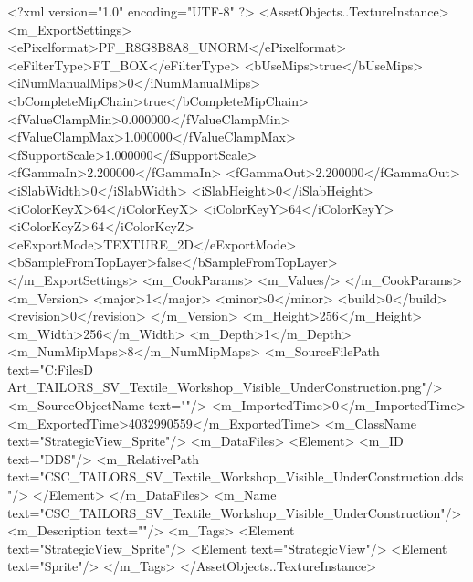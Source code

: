 <?xml version="1.0" encoding="UTF-8" ?>
<AssetObjects..TextureInstance>
	<m_ExportSettings>
		<ePixelformat>PF_R8G8B8A8_UNORM</ePixelformat>
		<eFilterType>FT_BOX</eFilterType>
		<bUseMips>true</bUseMips>
		<iNumManualMips>0</iNumManualMips>
		<bCompleteMipChain>true</bCompleteMipChain>
		<fValueClampMin>0.000000</fValueClampMin>
		<fValueClampMax>1.000000</fValueClampMax>
		<fSupportScale>1.000000</fSupportScale>
		<fGammaIn>2.200000</fGammaIn>
		<fGammaOut>2.200000</fGammaOut>
		<iSlabWidth>0</iSlabWidth>
		<iSlabHeight>0</iSlabHeight>
		<iColorKeyX>64</iColorKeyX>
		<iColorKeyY>64</iColorKeyY>
		<iColorKeyZ>64</iColorKeyZ>
		<eExportMode>TEXTURE_2D</eExportMode>
		<bSampleFromTopLayer>false</bSampleFromTopLayer>
	</m_ExportSettings>
	<m_CookParams>
		<m_Values/>
	</m_CookParams>
	<m_Version>
		<major>1</major>
		<minor>0</minor>
		<build>0</build>
		<revision>0</revision>
	</m_Version>
	<m_Height>256</m_Height>
	<m_Width>256</m_Width>
	<m_Depth>1</m_Depth>
	<m_NumMipMaps>8</m_NumMipMaps>
	<m_SourceFilePath text="C:\Users\Shadow\Desktop\Working Files\2D Art\Quarters\Tailors\StrategicView\CSC_TAILORS_SV_Textile_Workshop_Visible_UnderConstruction.png"/>
	<m_SourceObjectName text=""/>
	<m_ImportedTime>0</m_ImportedTime>
	<m_ExportedTime>4032990559</m_ExportedTime>
	<m_ClassName text="StrategicView_Sprite"/>
	<m_DataFiles>
		<Element>
			<m_ID text="DDS"/>
			<m_RelativePath text="CSC_TAILORS_SV_Textile_Workshop_Visible_UnderConstruction.dds"/>
		</Element>
	</m_DataFiles>
	<m_Name text="CSC_TAILORS_SV_Textile_Workshop_Visible_UnderConstruction"/>
	<m_Description text=""/>
	<m_Tags>
		<Element text="StrategicView_Sprite"/>
		<Element text="StrategicView"/>
		<Element text="Sprite"/>
	</m_Tags>
</AssetObjects..TextureInstance>

